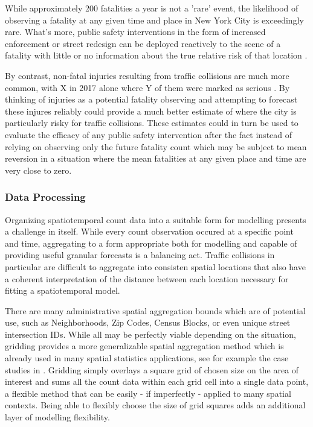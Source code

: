While approximately 200 fatalities a year is not a 'rare' event, the likelihood of observing a fatality at any given time and place in New York City is exceedingly rare. What's more, public safety interventions in the form of increased enforcement or street redesign can be deployed reactively to the scene of a fatality with little or no information about the true relative risk of that location . \par

By contrast, non-fatal injuries resulting from traffic collisions are much more common, with X in 2017 alone where Y of them were marked as serious . By thinking of injuries as a potential fatality observing and attempting to forecast these injures reliably could provide a much better estimate of where the city is particularly risky for traffic collisions. These estimates could in turn be used to evaluate the efficacy of any public safety intervention after the fact instead of relying on observing only the future fatality count which may be subject to mean reversion in a situation where the mean fatalities at any given place and time are very close to zero.

\subsubsection{Data Processing}

Organizing spatiotemporal count data into a suitable form for modelling presents a challenge in itself. While every count observation occured at a specific point and time, aggregating to a form appropriate both for modelling and capable of providing useful granular forecasts is a balancing act. Traffic collisions in particular are difficult to aggregate into consisten spatial locations that also have a coherent interpretation of the distance between each location necessary for fitting a spatiotemporal model. \par

There are many administrative spatial aggregation bounds which are of potential use, such as Neighborhoods, Zip Codes, Census Blocks, or even unique street intersection IDs. While all may be perfectly viable depending on the situation, gridding provides a more generalizable spatial aggregation method which is already used in many spatial statistics applications, see for example the case studies in \cite{blangiardo_2015}. Gridding simply overlays a square grid of chosen size on the area of interest and sums all the count data within each grid cell into a single data point, a flexible method that can be easily - if imperfectly - applied to many spatial contexts. Being able to flexibly choose the size of grid squares adds an additional layer of modelling flexibility. \par

